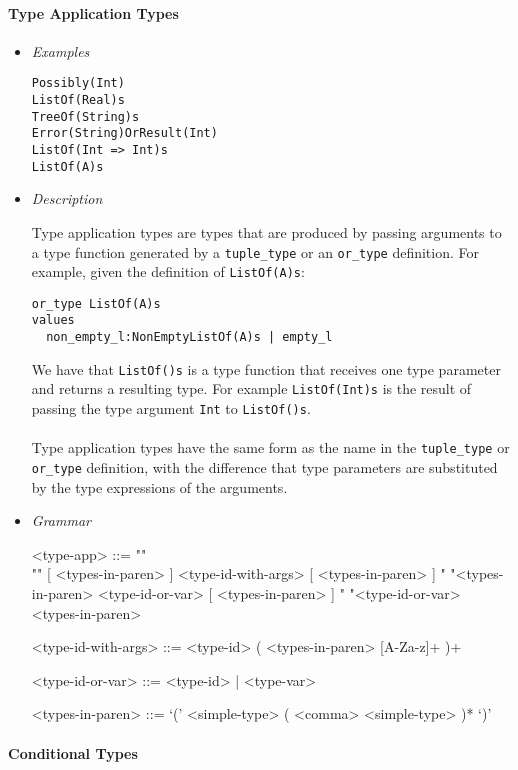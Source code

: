 \documentclass{article}
\begin{document}
\paragraph{Type Application Types}

\begin{itemize}
\item \textit{Examples}
\begin{verbatim}
Possibly(Int)
ListOf(Real)s
TreeOf(String)s 
Error(String)OrResult(Int)
ListOf(Int => Int)s
ListOf(A)s
\end{verbatim}

\item \textit{Description}

Type application types are types that are produced by passing arguments
to a type function generated by a \texttt{tuple_type} or an \texttt{or_type}
definition. For example, given the definition of \texttt{ListOf(A)s}:
\begin{verbatim}
or_type ListOf(A)s
values
  non_empty_l:NonEmptyListOf(A)s | empty_l
\end{verbatim}
We have that \texttt{ListOf()s} is a type function that receives one type parameter
and returns a resulting type. For example \texttt{ListOf(Int)s} is the result
of passing the type argument \texttt{Int} to \texttt{ListOf()s}.
\\\\
Type application types have the same form as the name in the
\texttt{tuple_type} or \texttt{or_type} definition, with the difference that
type parameters are substituted by the type expressions of the arguments.

\item \textit{Grammar}
\begin{grammar}
<type-app> ::= ""\\""
[ <types-in-paren> ] <type-id-with-args> [ <types-in-paren> ]
\alt " "<types-in-paren> <type-id-or-var> [ <types-in-paren> ]
\alt " "<type-id-or-var> <types-in-paren>

<type-id-with-args> ::= <type-id> ( <types-in-paren> [A-Za-z]+ )+

<type-id-or-var> ::= <type-id> | <type-var>

<types-in-paren> ::= `(' <simple-type> ( <comma> <simple-type> )* `)'
\end{grammar}
\end{itemize}

\paragraph{Conditional Types}
\end{document}
